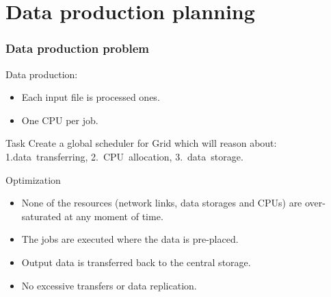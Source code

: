 \documentclass{beamer}
\begin{document}
\section{Data production planning}
\begin{frame}\frametitle{Data production problem}
	\begin{block}{Data production:}
		\begin{itemize}
			\item Each input file is processed ones.
			\item One CPU per job.
		\end{itemize}
 	\end{block}  

 		\begin{block}{Task}
Create a global scheduler for Grid which will reason about:\\
\hspace{1cm} 1.data~transferring, \hspace{1cm} 2.~CPU~allocation,\hspace{1cm} 3.~data~storage.  
\end{block}
\begin{block}{Optimization}  
		\begin{itemize}
			\item None of the resources (network links, data storages and CPUs) are over-saturated at any moment of time.
			\item The jobs are executed  where the data is pre-placed.
			\item Output data is transferred back to the central storage.
			\item No excessive transfers or data replication.
		\end{itemize}
 	\end{block}
	
\end{frame}
\end{document}
